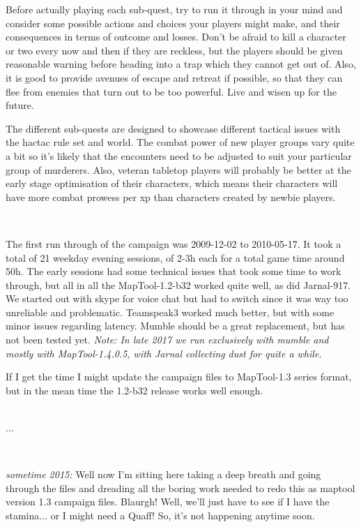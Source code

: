 Before actually playing each sub-quest, try to run it through in your mind and consider some possible actions and choices your players might make, and their consequences in terms of outcome and losses. Don't be afraid to kill a character or two every now and then if they are reckless, but the players should be given reasonable warning before heading into a trap which they cannot get out of. Also, it is good to provide avenues of escape and retreat if possible, so that they can flee from enemies that turn out to be too powerful. Live and wisen up for the future.

The different sub-quests are designed to showcase different tactical issues with the hactac rule set and world. The combat power of new player groups vary quite a bit so it's likely that the encounters need to be adjusted to suit your particular group of murderers. Also, veteran tabletop players will probably be better at the early stage optimisation of their characters, which means their characters will have more combat prowess per xp than characters created by newbie players.

\

The first run through of the campaign was 2009-12-02 to 2010-05-17. It took a total of 21 weekday evening sessions, of 2-3h each for a total game time around 50h. The early sessions had some technical issues that took some time to work through, but all in all the MapTool-1.2-b32 worked quite well, as did Jarnal-917. We started out with skype for voice chat but had to switch since it was way too unreliable and problematic. Teamspeak3 worked much better, but with some minor issues regarding latency. Mumble should be a great replacement, but has not been tested yet. \emph{Note: In late 2017 we run exclusively with mumble and mostly with MapTool-1.4.0.5, with Jarnal collecting dust for quite a while.}

If I get the time I might update the campaign files to MapTool-1.3 series format, but in the mean time the 1.2-b32 release works well enough.\\

\

...

\

\emph{sometime 2015:} Well now I'm sitting here taking a deep breath and going through the files and dreading all the boring work needed to redo this as maptool version 1.3 campaign files. Blaurgh! Well, we'll just have to see if I have the stamina... or I might need a Quaff! So, it's not happening anytime soon.

